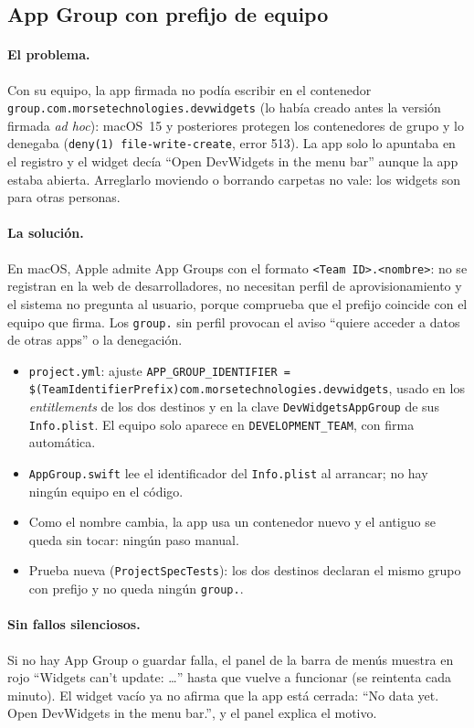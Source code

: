 \documentclass[11pt,a4paper]{article}
\begin{document}
\subsection{App Group con prefijo de equipo}\label{sec:appgroup}
\paragraph{El problema.} Con su equipo, la app firmada no podía
escribir en el contenedor \texttt{group.com.morsetechnologies.devwidgets}
(lo había creado antes la versión firmada \emph{ad hoc}): macOS~15 y
posteriores protegen los contenedores de grupo y lo denegaba
(\texttt{deny(1) file-write-create}, error 513). La app solo lo
apuntaba en el registro y el widget decía ``Open DevWidgets in the
menu bar'' aunque la app estaba abierta. Arreglarlo moviendo o
borrando carpetas no vale: los widgets son para otras personas.

\paragraph{La solución.} En macOS, Apple admite App Groups con el
formato \texttt{<Team ID>.<nombre>}: no se registran en la web de
desarrolladores, no necesitan perfil de aprovisionamiento y el sistema
no pregunta al usuario, porque comprueba que el prefijo coincide con
el equipo que firma. Los \texttt{group.} sin perfil provocan el aviso
``quiere acceder a datos de otras apps'' o la denegación.
\begin{itemize}
  \item \texttt{project.yml}: ajuste \texttt{APP\_GROUP\_IDENTIFIER =
    \$(TeamIdentifierPrefix)com.morsetechnologies.devwidgets}, usado
    en los \emph{entitlements} de los dos destinos y en la clave
    \texttt{DevWidgetsAppGroup} de sus \texttt{Info.plist}. El equipo
    solo aparece en \texttt{DEVELOPMENT\_TEAM}, con firma automática.
  \item \texttt{AppGroup.swift} lee el identificador del
    \texttt{Info.plist} al arrancar; no hay ningún equipo en el código.
  \item Como el nombre cambia, la app usa un contenedor nuevo y el
    antiguo se queda sin tocar: ningún paso manual.
  \item Prueba nueva (\texttt{ProjectSpecTests}): los dos destinos
    declaran el mismo grupo con prefijo y no queda ningún
    \texttt{group.}.
\end{itemize}

\paragraph{Sin fallos silenciosos.} Si no hay App Group o guardar
falla, el panel de la barra de menús muestra en rojo ``Widgets can't
update: \ldots'' hasta que vuelve a funcionar (se reintenta cada
minuto). El widget vacío ya no afirma que la app está cerrada: ``No
data yet. Open DevWidgets in the menu bar.'', y el panel explica el
motivo.
\end{document}
